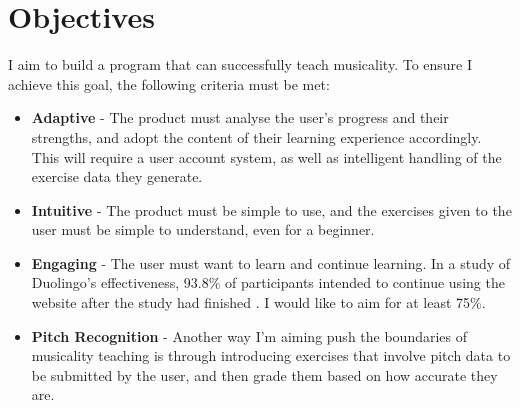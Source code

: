 \section{Objectives}

I aim to build a program that can successfully teach musicality. To ensure I achieve this goal, the following criteria must be met:
	\begin{itemize}
		\item \textbf{Adaptive} - The product must analyse the user's progress and their strengths, and adopt the content of their learning experience accordingly. This will require a user account system, as well as intelligent handling of the exercise data they generate.
		\item \textbf{Intuitive} - The product must be simple to use, and the exercises given to the user must be simple to understand, even for a beginner.
		\item \textbf{Engaging} - The user must want to learn and continue learning. In a study of Duolingo's effectiveness, 93.8\% of participants intended to continue using the website after the study had finished \cite{griffiths2012profile}. I would like to aim for at least 75\%.
		\item \textbf{Pitch Recognition} - Another way I'm aiming push the boundaries of musicality teaching is through introducing exercises that involve pitch data to be submitted by the user, and then grade them based on how accurate they are.
	\end{itemize}